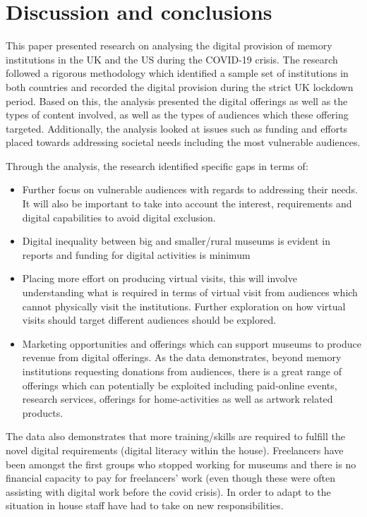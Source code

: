 \documentclass{egpubl}
\begin{document}
\section{Discussion and conclusions}
\label{disc}
This paper presented research on analysing the digital provision of memory institutions in the UK and the US during the COVID-19 crisis. The research followed a rigorous methodology which identified a sample set of institutions in both countries and recorded the digital provision during the strict UK lockdown period. Based on this, the analysis presented the digital offerings as well as the types of content involved, as well as the types of audiences which these offering targeted. Additionally, the analysis looked at issues such as funding and efforts placed towards addressing societal needs including the most vulnerable audiences.

Through the analysis, the research identified specific gaps in terms of:

\begin{itemize}
\item Further focus on vulnerable audiences with regards to addressing their needs. It will also be important to take into account the interest, requirements and digital capabilities  to avoid digital exclusion.
\item Digital inequality between big and smaller/rural museums is evident in reports and funding for digital activities is minimum 
\item Placing more effort on producing virtual visits, this will involve understanding what is required in terms of virtual visit from audiences which cannot physically visit the institutions. Further exploration on how virtual visits should target different audiences should be explored.
\item Marketing opportunities and offerings which can support museums to produce revenue from digital offerings. As the data demonstrates, beyond memory institutions requesting donations from audiences, there is a great range of offerings which can potentially be exploited including paid-online events, research services, offerings for home-activities as well as artwork related products.
\end{itemize}

The  data also demonstrates that more training/skills are required to fulfill the novel digital requirements (digital literacy within the house). Freelancers have been amongst the first groups who stopped working for museums and there is no financial capacity to pay for freelancers' work (even though these were often assisting with digital work before the covid crisis). In order to adapt to the situation in house staff have had to take on new responsibilities. 
\end{document}
